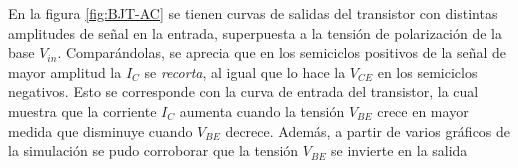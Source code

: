 \documentclass[../main.tex]{subfiles}
\begin{document}

En la figura \ref{fig:BJT-AC} se tienen curvas de salidas del transistor con distintas amplitudes de señal en la entrada, superpuesta a la tensión de polarización de la base $V_{in}$. Comparándolas, se aprecia que en los semiciclos positivos de la señal de mayor amplitud la $I_C$ se \emph{recorta}, al igual que lo hace la $V_{CE}$ en los semiciclos negativos. Esto se corresponde con la curva de entrada del transistor, la cual muestra que la corriente $I_C$ aumenta cuando la tensión $V_{BE}$ crece en mayor medida que disminuye cuando $V_{BE}$ decrece. Además, a partir de varios gráficos de la simulación se pudo corroborar que la tensión $V_{BE}$ se invierte en la salida  



\end{document}

